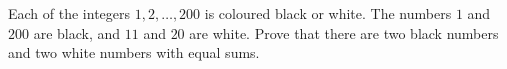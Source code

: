 Each of the integers $1,2,\dots,200$ is coloured black or white. The numbers $1$ and $200$ are black, and $11$ and $20$ are white. Prove that there are two black numbers and two white numbers with equal sums.
